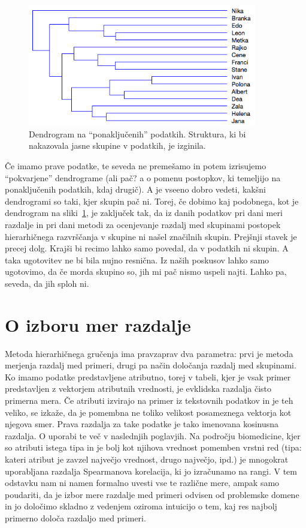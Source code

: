 \begin{figure}[htbp]
\begin{center}
\includegraphics[width=10cm]{slike/dendrogram-premesano.png}
\caption{Dendrogram na ``ponaključenih'' podatkih. Struktura, ki bi
  nakazovala jasne skupine v podatkih, je izginila.}
\label{f-dendrogram-premesano}
\end{center}
\end{figure}

Če imamo prave podatke, te seveda ne premešamo in potem izrisujemo
``pokvarjene'' dendrograme (ali pač? a o pomenu postopkov, ki
temeljijo na ponaključenih podatkih, kdaj drugič). A je vseeno dobro
vedeti, kakšni dendrogrami so taki, kjer skupin pač ni. Torej, če
dobimo kaj podobnega, kot je dendrogram na
sliki~\ref{f-dendrogram-premesano}, je zaključek tak, da iz danih
podatkov pri dani meri razdalje in pri dani metodi za ocenjevanje
razdalj med skupinami postopek hierarhičnega razvrščanja v skupine ni
našel značilnih skupin. Prejšnji stavek je precej dolg. Krajši bi
recimo lahko samo povedal, da v podatkih ni skupin. A taka ugotovitev
ne bi bila nujno resnična. Iz naših poskusov lahko samo ugotovimo, da
če morda skupino so, jih mi pač nismo uspeli najti. Lahko pa, seveda,
da jih sploh ni.

\section{O izboru mer razdalje}

Metoda hierarhičnega gručenja ima pravzaprav dva parametra: prvi je metoda merjenja razdalj med primeri, drugi pa način določanja razdalj med skupinami. Ko imamo podatke predstavljene atributno, torej v tabeli, kjer je vsak primer predstavljen z vektorjem atributnih vrednosti, je evklidska razdalja čisto primerna mera. Če atributi izvirajo na primer iz tekstovnih podatkov in je teh veliko, se izkaže, da je pomembna ne toliko velikost posameznega vektorja kot njegova smer. Prava razdalja za take podatke je tako imenovana kosinusna razdalja. O uporabi te več v naslednjih poglavjih. Na področju biomedicine, kjer so atributi istega tipa in je bolj kot njihova vrednost pomemben vrstni red (tipa: kateri atribut je zavzel največjo vrednost, drugo največjo, ipd.) je mnogokrat uporabljana razdalja Spearmanova korelacija, ki jo izračunamo na rangi. V tem odstavku nam ni namen formalno uvesti vse te različne mere, ampak samo poudariti, da je izbor mere razdalje med primeri odvisen od problemske domene in jo določimo skladno z vedenjem oziroma intuicijo o tem, kaj res najbolj primerno določa razdaljo med primeri.

